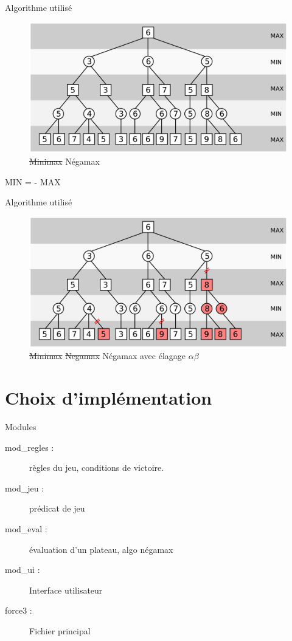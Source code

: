 \documentclass[compress, 12pt]{beamer}
\begin{document}
\begin{frame}{Algorithme utilisé}
  \begin{figure}
    \includegraphics[width=\textwidth]{pix/minimax}
    \centering
    \caption{\st{Minimax} Négamax}
  \end{figure}
  \begin{center}
  MIN = - MAX
  \end{center}
\end{frame}

\begin{frame}{Algorithme utilisé}
  \begin{figure}
    \includegraphics[height=0.6\textheight]{pix/alphabeta}
    \centering
    \caption{
        \st{Minimax}
        \st{Negamax}
        Négamax avec élagage $\alpha\beta$}
  \end{figure}
\end{frame}

\section{Choix d’implémentation}
    \begin{frame}{Modules}
        \begin{description}
            \item[mod\_regles :] règles du jeu, conditions de victoire.
            \item[mod\_jeu :] prédicat de jeu
            \item[mod\_eval :] évaluation d'un plateau, algo négamax
            \item[mod\_ui :] Interface utilisateur
            \item[force3 :] Fichier principal
        \end{description}
    \end{frame}
\end{document}
